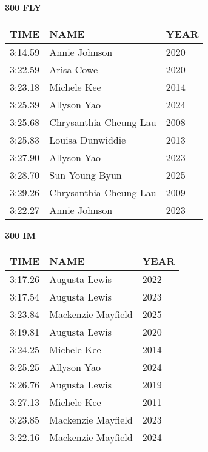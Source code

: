 \begin{minipage}[t]{0.48\textwidth}
\centering
\textbf{300 FLY}\\[0.05cm]
\begin{tabular}{@{}p{1.8cm}p{2.8cm}p{1.2cm}@{}}
\hline
\textbf{TIME} & \textbf{NAME} & \textbf{YEAR} \\
\hline
3:14.59 & Annie Johnson & 2020 \\
3:22.59 & Arisa Cowe & 2020 \\
3:23.18 & Michele Kee & 2014 \\
3:25.39 & Allyson Yao & 2024 \\
3:25.68 & Chrysanthia Cheung-Lau & 2008 \\
3:25.83 & Louisa Dunwiddie & 2013 \\
3:27.90 & Allyson Yao & 2023 \\
3:28.70 & Sun Young Byun & 2025 \\
3:29.26 & Chrysanthia Cheung-Lau & 2009 \\
3:22.27 & Annie Johnson & 2023 \\
\hline
\end{tabular}
\end{minipage}\hfill
\begin{minipage}[t]{0.48\textwidth}
\centering
\textbf{300 IM}\\[0.05cm]
\begin{tabular}{@{}p{1.8cm}p{2.8cm}p{1.2cm}@{}}
\hline
\textbf{TIME} & \textbf{NAME} & \textbf{YEAR} \\
\hline
3:17.26 & Augusta Lewis & 2022 \\
3:17.54 & Augusta Lewis & 2023 \\
3:23.84 & Mackenzie Mayfield & 2025 \\
3:19.81 & Augusta Lewis & 2020 \\
3:24.25 & Michele Kee & 2014 \\
3:25.25 & Allyson Yao & 2024 \\
3:26.76 & Augusta Lewis & 2019 \\
3:27.13 & Michele Kee & 2011 \\
3:23.85 & Mackenzie Mayfield & 2023 \\
3:22.16 & Mackenzie Mayfield & 2024 \\
\hline
\end{tabular}
\end{minipage}

\vspace{0.4cm}

